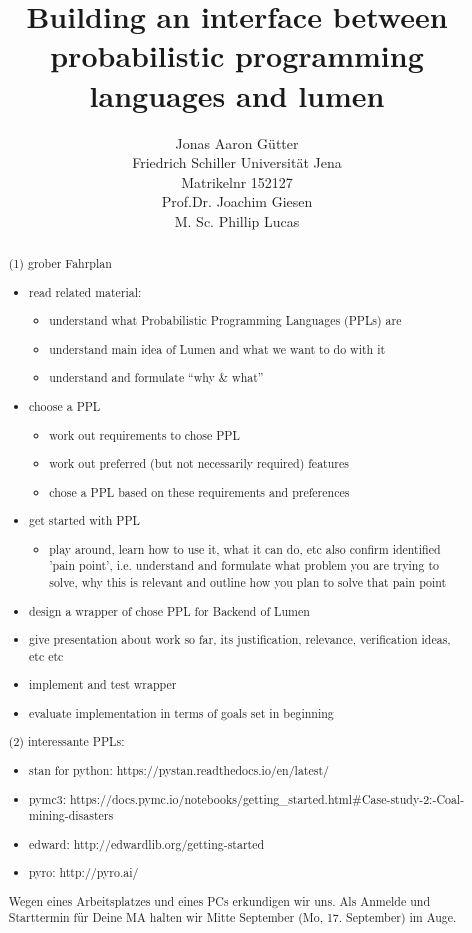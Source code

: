 \documentclass{article}
\title{Building an interface between probabilistic programming languages and lumen}
\author{Jonas Aaron Gütter  \\
	Friedrich Schiller Universität Jena  \\
    Matrikelnr 152127 \\
    Prof.Dr. Joachim Giesen \\
    M. Sc. Phillip Lucas
	}
\begin{document}
\maketitle

\begin{abstract}
(1) grober Fahrplan
\begin{itemize}
   \item read related material:
        \begin{itemize}
        \item understand what Probabilistic Programming Languages (PPLs) are
        \item understand main idea of Lumen and what we want to do with it
        \item understand and formulate “why \& what”
        \end{itemize}
    \item choose a PPL
        \begin{itemize}
        \item work out requirements to chose PPL
        \item work out preferred (but not necessarily required) features
        \item chose a PPL based on these requirements and preferences
        \end{itemize}
    \item get started with PPL
    	\begin{itemize}
        \item play around, learn how to use it, what it can do, etc
              also confirm identified 'pain point', i.e. understand and
              formulate what problem you are trying to solve, why this is
              relevant and outline how you plan to solve that pain point
        \end{itemize}
    \item design a wrapper of chose PPL for Backend of Lumen
    \item give presentation about work so far, its justification, relevance, verification ideas, etc etc
    \item implement and test wrapper
    \item evaluate implementation in terms of goals set in beginning

\end{itemize}
(2) interessante PPLs:

\begin{itemize}
     \item stan for python: https://pystan.readthedocs.io/en/latest/
    \item pymc3: https://docs.pymc.io/notebooks/getting\_started.html\#Case-study-2:-Coal-mining-disasters
    \item edward: http://edwardlib.org/getting-started
    \item pyro: http://pyro.ai/
\end{itemize}
Wegen eines Arbeitsplatzes und eines PCs erkundigen wir uns.
Als Anmelde und Starttermin für Deine MA halten wir Mitte September (Mo, 17. September) im Auge.

\end{abstract}
\end{document}
